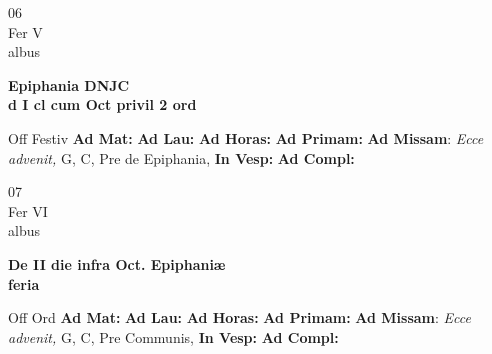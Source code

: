 \documentclass[10pt, openany]{book}
\begin{document}
    \begin{center}
        \begin{minipage}{3.5in}
            \vspace{2em}
            \begin{minipage}{0.5in}
                {\Huge 06} \\
                {\normalsize Fer V} \\
                {\normalsize albus}
            \end{minipage}
            \begin{minipage}{3.0in}
                \textbf{ \large Epiphania DNJC \\
                \textnormal{\normalsize d I cl cum Oct privil 2 ord}} \\ 
            \end{minipage}
            \begin{justify}Off Festiv
                \textbf{Ad Mat: }
                \textbf{Ad Lau: }
                \textbf{Ad Horas: }
                \textbf{Ad Primam: }\textbf{Ad Missam}: \textit{Ecce advenit,} G, C, Pre de Epiphania,  
                \textbf{In Vesp: }
                \textbf{Ad Compl: }
            \end{justify}
        \end{minipage}
    \end{center}

    \begin{center}
        \begin{minipage}{3.5in}
            \vspace{2em}
            \begin{minipage}{0.5in}
                {\Huge 07} \\
                {\normalsize Fer VI} \\
                {\normalsize albus}
            \end{minipage}
            \begin{minipage}{3.0in}
                \textbf{ \large De II die infra Oct. Epiphaniæ \\
                \textnormal{\normalsize feria}} \\ 
            \end{minipage}
            \begin{justify}Off Ord
                \textbf{Ad Mat: }
                \textbf{Ad Lau: }
                \textbf{Ad Horas: }
                \textbf{Ad Primam: }\textbf{Ad Missam}: \textit{Ecce advenit,} G, C, Pre Communis,  
                \textbf{In Vesp: }
                \textbf{Ad Compl: }
            \end{justify}
        \end{minipage}
    \end{center}
\end{document}
